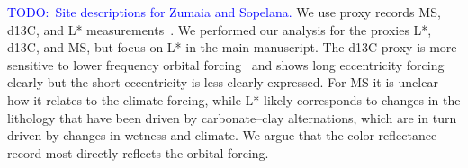 \documentclass[draft]{agujournal2019}
\newcommand{\ijk}{\textcolor{blue}}
\begin{document}
\ijk{TODO:\ Site descriptions for Zumaia and Sopelana.}
We use proxy records \gls{MS}, \gls{d13C}, and \gls{L*} measurements~\cite{Batenburg2012,Batenburg2014}.
We performed our analysis for the proxies \gls{L*}, \gls{d13C}, and \gls{MS}, but  focus on \gls{L*} in the main manuscript.
The \gls{d13C} proxy is more sensitive to lower frequency orbital forcing~\cite{Zeebe2017,Kocken2019loscar} and shows long eccentricity forcing clearly but the short eccentricity is less clearly expressed.
For \gls{MS} it is unclear how it relates to the climate forcing, %
while \gls{L*} likely corresponds to changes in the lithology that have been driven by carbonate--clay alternations, which are in turn driven by changes in wetness and climate.
We argue that the color reflectance record most directly reflects the orbital forcing.
\end{document}
